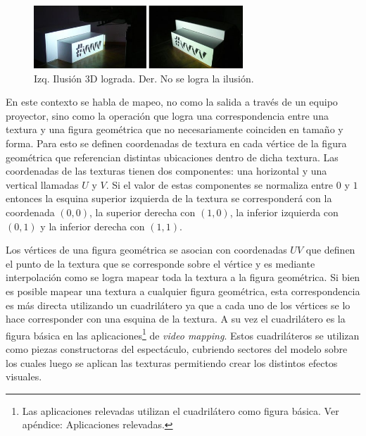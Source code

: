 \begin{figure}[H]
  \centering
    \includegraphics[width=0.7\textwidth]{./Cap2_videomapping/3dillusion}
  \caption[vvvv.org]{Izq. Ilusión 3D lograda. Der. No se logra la ilusión.}
  \label{fig:3dillusion}
\end{figure}

En este contexto se habla de mapeo, no como la salida a través de un equipo proyector, sino como la operación que logra una correspondencia entre una textura y una figura geométrica que no necesariamente coinciden en tamaño y forma. Para esto se definen coordenadas de textura en cada vértice de la figura geométrica que referencian distintas ubicaciones dentro de dicha textura.
Las coordenadas de las texturas tienen dos componentes: una horizontal y una vertical llamadas $U$ y $V$. Si el valor de estas componentes se normaliza entre $0$ y $1$ entonces la esquina superior izquierda de la textura se corresponderá con la coordenada $(0,0)$, la superior derecha con $(1,0)$, la inferior izquierda con $(0,1)$ y la inferior derecha con $(1,1)$.


Los vértices de una figura geométrica se asocian con coordenadas $UV$ que definen el punto de la textura que se corresponde sobre el vértice y es mediante interpolación como se logra mapear toda la textura a la figura geométrica.
Si bien es posible mapear una textura a cualquier figura geométrica, esta correspondencia es más directa utilizando un cuadrilátero ya que a cada uno de los vértices se lo hace corresponder con una esquina de la textura. A su vez el cuadrilátero es la figura básica en las aplicaciones\footnote{Las aplicaciones relevadas utilizan el cuadrilátero como figura básica. Ver apéndice: Aplicaciones relevadas.} de \emph{video mapping}.
Estos cuadriláteros se utilizan como piezas constructoras del espectáculo, cubriendo sectores del modelo sobre los cuales luego se aplican las texturas permitiendo crear los distintos efectos visuales.

